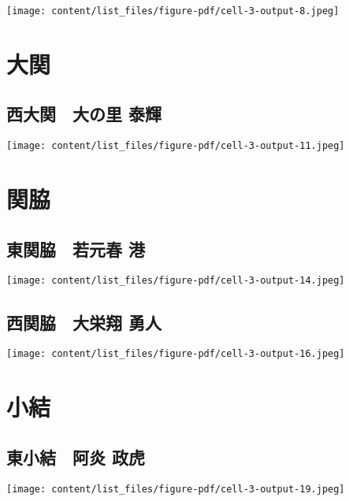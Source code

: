 \documentclass[
  letterpaper,
]{bxjsbook}
\begin{document}
\texttt{[image: content/list\_files/figure-pdf/cell-3-output-8.jpeg]}

\section{大関}\label{ux5927ux95a2-1}

\subsection{西大関　大の里
泰輝}\label{ux897fux5927ux95a2-ux5927ux306eux91cc-ux6cf0ux8f1d}

\texttt{[image: content/list\_files/figure-pdf/cell-3-output-11.jpeg]}

\section{関脇}\label{ux95a2ux8107}

\subsection{東関脇　若元春
港}\label{ux6771ux95a2ux8107-ux82e5ux5143ux6625-ux6e2f}

\texttt{[image: content/list\_files/figure-pdf/cell-3-output-14.jpeg]}

\subsection{西関脇　大栄翔
勇人}\label{ux897fux95a2ux8107-ux5927ux6804ux7fd4-ux52c7ux4eba}

\texttt{[image: content/list\_files/figure-pdf/cell-3-output-16.jpeg]}

\section{小結}\label{ux5c0fux7d50}

\subsection{東小結　阿炎
政虎}\label{ux6771ux5c0fux7d50-ux963fux708e-ux653fux864e}

\texttt{[image: content/list\_files/figure-pdf/cell-3-output-19.jpeg]}
\end{document}
